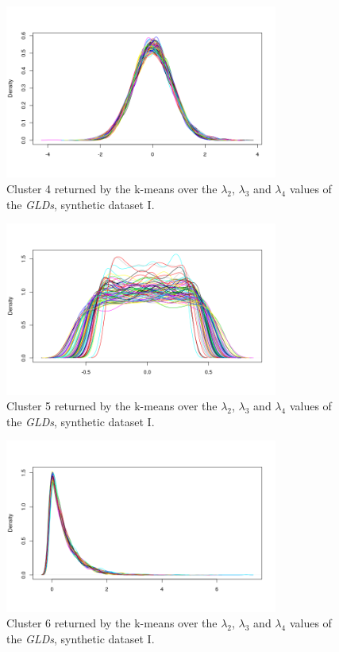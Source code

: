 \begin{figure}[H]
    \centering
    \includegraphics[width=0.8\textwidth]{img/gld_clustering/Dataset1/l2_l3_l4/cluster5.png}
    \caption{Cluster 4 returned by the k-means over the $\lambda_{2}$, $\lambda_{3}$ and $\lambda_{4}$ values of the \textit{GLDs}, synthetic dataset I.}
    \label{fig:dataset1_l2l3l4_cl4}
\end{figure}

\begin{figure}[H]
    \centering
    \includegraphics[width=0.8\textwidth]{img/gld_clustering/Dataset1/l2_l3_l4/cluster7.png}
    \caption{Cluster 5 returned by the k-means over the $\lambda_{2}$, $\lambda_{3}$ and $\lambda_{4}$ values of the \textit{GLDs}, synthetic dataset I.}
    \label{fig:dataset1_l2l3l4_cl5}
\end{figure}

\begin{figure}[H]
    \centering
    \includegraphics[width=0.8\textwidth]{img/gld_clustering/Dataset1/l2_l3_l4/intento_3/cluster6.png}
    \caption{Cluster 6 returned by the k-means over the $\lambda_{2}$, $\lambda_{3}$ and $\lambda_{4}$ values of the \textit{GLDs}, synthetic dataset I.}
    \label{fig:dataset1_l2l3l4_cl6}
\end{figure}

